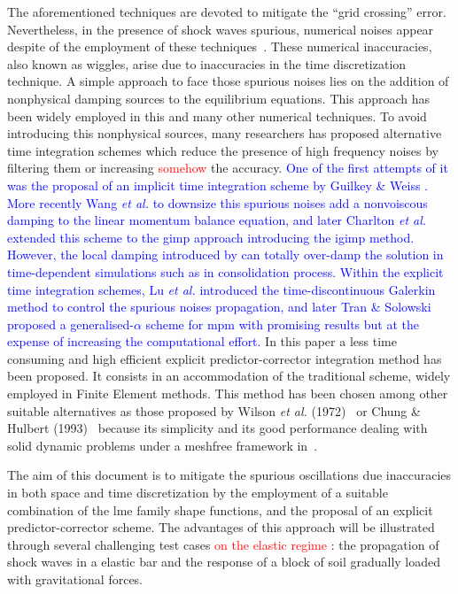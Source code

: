 \documentclass[preprint,12pt,a4paper]{elsarticle}
\newcommand{\PNA}[1]{
  \textcolor{red}{{#1}}
}
\newcommand{\MMP}[1]{
  \textcolor{blue}{{#1}}
}
\begin{document}
The aforementioned techniques are devoted to mitigate the
``grid crossing'' error. Nevertheless, in the presence of shock waves spurious,
numerical noises appear despite of the employment of these
techniques~\cite{Tran2019e}. These numerical inaccuracies, also known
as wiggles, arise due to inaccuracies in the time discretization technique.
A simple approach to face those spurious noises lies on the addition of nonphysical damping sources to the equilibrium equations. This
approach has been widely employed in this and many other numerical
techniques. To avoid introducing this nonphysical sources, many
researchers has proposed alternative time integration
schemes which reduce the presence of high frequency noises by
filtering them or increasing\PNA{somehow} the accuracy.\MMP{One of the first attempts of it was
the proposal of an implicit time integration scheme by Guilkey \&
Weiss \cite{Guilkey_2003}. More recently Wang {\it et al.}
\cite{Wang_2016} to downsize this spurious noises add a nonvoiscous
damping to the linear momentum balance equation, and later Charlton
{\it et al.} \cite{Charlton_2017} extended this scheme to the
\acrshort{gimp} approach introducing the \acrfull{igimp}
method. However, the local damping introduced by 
\cite{Wang_2016} can totally over-damp the solution in time-dependent
simulations such as in consolidation process. Within the explicit
time integration schemes, Lu {\it et al.}\cite{LU_2018} introduced the time-discontinuous Galerkin method to control the spurious noises
propagation, and later Tran \& Solowski~\cite{Tran2019e}
proposed a generalised-$\alpha$ scheme for \acrshort{mpm} with
promising results but at the expense of increasing the computational
effort.} In this paper a less time consuming and high efficient explicit predictor-corrector integration method has been
proposed. It consists in an accommodation of the traditional  scheme, widely employed in Finite Element methods. This method
has been chosen among other suitable alternatives as those proposed
by Wilson {\it et al.} (1972)~\cite{Wilson1972} or Chung \& Hulbert
(1993)~\cite{Geranlized_alpha_1993} because its simplicity and its good
performance dealing with solid dynamic problems under a meshfree
framework in~\cite{Navas2018a}.

The aim of this document is to mitigate the spurious oscillations due
inaccuracies in both space and time discretization by the employment of a
suitable combination of the \acrshort{lme} family shape functions, and the proposal of an explicit predictor-corrector scheme. The advantages of
this approach will be illustrated through several challenging test cases\PNA{on the elastic regime}: the
propagation of shock waves in a elastic bar and the response of a block of soil gradually loaded with gravitational forces.
\end{document}
